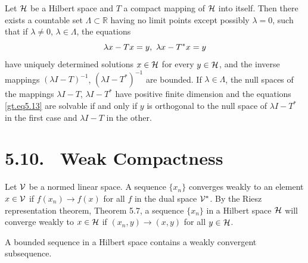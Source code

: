 \begin{theorem}\label{gt.thm5.11}
Let $\Hspace$ be a Hilbert space and $T$ a compact mapping of $\Hspace$ into itself. Then there exists a countable set $\Lambda \subset \mathbb{R}$ having no limit points except possibly $\lambda=0$, such that if $\lambda\neq 0$, $\lambda\in \Lambda$, the equations
\begin{equation}\label{gt.eq5.13}\dcref{(5.13)}\group{chapter-5}\source{gilbarg-trudinger:page-0096,page-0097}
\lambda x-Tx=y,\ \lambda x-T^*x=y
\end{equation}
have uniquely determined solutions $x\in \Hspace$ for every $y\in \Hspace$, and the inverse mappings $(\lambda I-T)^{-1}$, $(\lambda I-T^*)^{-1}$ are bounded. If $\lambda\in\Lambda$, the null spaces of the mappings $\lambda I-T$, $\lambda I-T^*$ have positive finite dimension and the equations \eqref{gt.eq5.13} are solvable if and only if $y$ is orthogonal to the null space of $\lambda I-T^*$ in the first case and $\lambda I-T$ in the other.
\end{theorem}

\section*{5.10. \ Weak Compactness}

\begin{definition}\label{gt.def5.10.weak-convergence}
Let $\V$ be a normed linear space. A sequence $\{x_n\}$ converges weakly to an element $x\in \V$ if $f(x_n)\to f(x)$ for all $f$ in the dual space $\V^*$. By the Riesz representation theorem, Theorem 5.7, a sequence $\{x_n\}$ in a Hilbert space $\Hspace$ will converge weakly to $x\in \Hspace$ if $(x_n,y)\to(x,y)$ for all $y\in \Hspace$.
\end{definition}

\begin{theorem}\label{gt.thm5.12}
A bounded sequence in a Hilbert space contains a weakly convergent subsequence.
\end{theorem}

